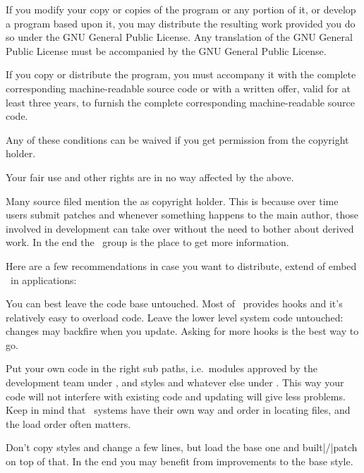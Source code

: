If you modify your copy or copies of the program or any portion of it, or develop
a program based upon it, you may distribute the resulting work provided you do so
under the GNU General Public License. Any translation of the GNU General Public
License must be accompanied by the GNU General Public License.

If you copy or distribute the program, you must accompany it with the complete
corresponding machine-readable source code or with a written offer, valid for at
least three years, to furnish the complete corresponding machine-readable source
code.

Any of these conditions can be waived if you get permission from the copyright
holder.

Your fair use and other rights are in no way affected by the above.
\stopcolor

Many source filed mention the  as
copyright holder. This is because over time users submit patches and whenever
something happens to the main author, those involved in development can take
over without the need to bother about derived work. In the end the \CONTEXT\
group is the place to get more information.

\stopsubject

\startsubject[title={Recommendations}]

Here are a few recommendations in case you want to distribute, extend of embed
\CONTEXT\ in applications:

\startitemize

\startitem
    You can best leave the code base untouched. Most of \CONTEXT\ provides hooks
    and it's relatively easy to overload code. Leave the lower level system code
    untouched: changes may backfire when you update. Asking for more hooks is the
    best way to go.
\stopitem

\startitem
    Put your own code in the right sub paths, i.e.\ modules approved by the
    development team under \type {.../third}, and styles and whatever else under
    \type {.../user}. This way your code will not interfere with existing code
    and updating will give less problems. Keep in mind that \TEX\ systems have
    their own way and order in locating files, and the load order often matters.
\stopitem

\startitem
    Don't copy styles and change a few lines, but load the base one and
    built|/|patch on top of that. In the end you may benefit from improvements to
    the base style.
\stopitem

